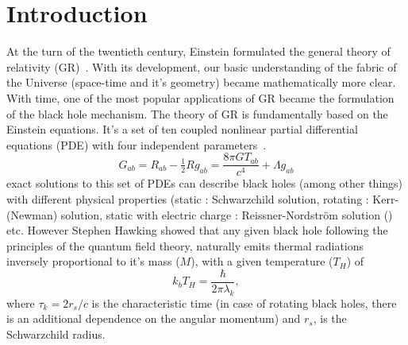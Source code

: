 \documentclass[fleqn,usenatbib]{mnras}
\begin{document}
\section{Introduction} \label{sec1}
At the turn of the twentieth century,  Einstein formulated the general theory of relativity (GR)~\citep{ein}. With its development, our basic understanding of the fabric of the Universe  (space-time and it's geometry) became mathematically more clear. With time, one of the most popular applications of GR became the formulation of the black hole mechanism. The theory of GR is fundamentally based on the Einstein equations. It's a set of ten coupled nonlinear partial differential equations (PDE) with four independent parameters~\citep{carol,misner}.
\begin{equation}\label{a}
     G_{ab} = R_{ab} - \tfrac{1}{2} R g_{ab}=\frac{8{\pi}G T_{ab}}{c^4} + \Lambda g_{ab}
\end{equation}
exact solutions to this set of  PDEs can describe black holes (among other things)  with different physical properties (static : Schwarzchild solution, rotating : Kerr- (Newman) solution, static with electric charge : Reissner-Nordstr{\"o}m solution  (\citep{frolov,eric,carol,misner}) etc. However Stephen Hawking showed \citep{hawking} that any given black hole following the principles of the quantum field theory, naturally emits thermal radiations inversely proportional to it's mass ($M$), with a given temperature ($T_H$) of 
\begin{equation}\label{b}
k_bT_{H}=\frac{{\hbar}}{2{\pi}\lambda_k},
\end{equation}
where $\tau_k=2r_s/c$ is the characteristic time (in case of rotating black holes, there is an additional dependence on the angular momentum) and $r_s$, is the Schwarzchild radius. 
\end{document}
